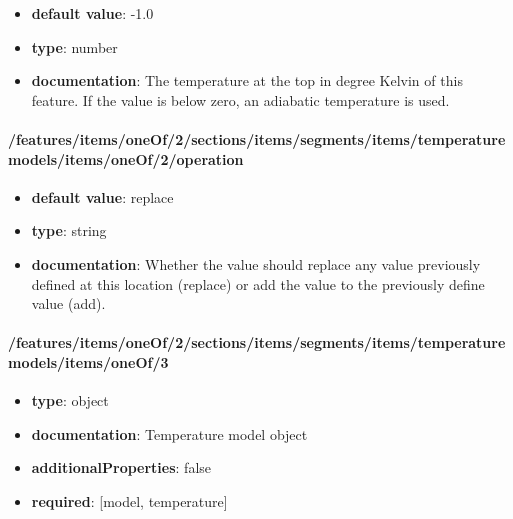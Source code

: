 \begin{itemize}\item {\bf default value}: -1.0
\item {\bf type}: number
\item {\bf documentation}: The temperature at the top in degree Kelvin of this feature. If the value is below zero, an adiabatic temperature is used.
\end{itemize}\paragraph{/features/items/oneOf/2/sections/items/segments/items/temperature models/items/oneOf/2/operation}
\begin{itemize}\item {\bf default value}: replace
\item {\bf type}: string
\item {\bf documentation}: Whether the value should replace any value previously defined at this location (replace) or add the value to the previously define value (add).
\end{itemize}\paragraph{/features/items/oneOf/2/sections/items/segments/items/temperature models/items/oneOf/3}
\begin{itemize}\item {\bf type}: object
\item {\bf documentation}: Temperature model object
\item {\bf additionalProperties}: false
\item {\bf required}: [model, temperature]\end{itemize}
